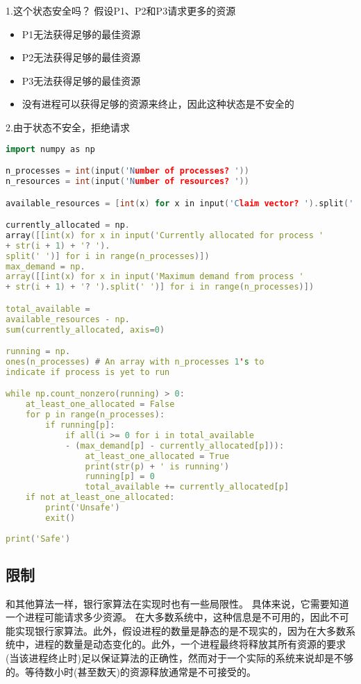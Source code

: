 1.这个状态安全吗？ 假设P1、P2和P3请求更多的资源
\begin{itemize}
\item P1无法获得足够的最佳资源
\item P2无法获得足够的最佳资源
\item P3无法获得足够的最佳资源
\item 没有进程可以获得足够的资源来终止，因此这种状态是不安全的
\end{itemize}

2.由于状态不安全，拒绝请求
\begin{lstlisting}[language=cpp]
import numpy as np

n_processes = int(input('Number of processes? '))
n_resources = int(input('Number of resources? '))

available_resources = [int(x) for x in input('Claim vector? ').split(' ')]

currently_allocated = np.
array([[int(x) for x in input('Currently allocated for process ' 
+ str(i + 1) + '? ').
split(' ')] for i in range(n_processes)])
max_demand = np.
array([[int(x) for x in input('Maximum demand from process ' 
+ str(i + 1) + '? ').split(' ')] for i in range(n_processes)])

total_available = 
available_resources - np.
sum(currently_allocated, axis=0)

running = np.
ones(n_processes) # An array with n_processes 1's to 
indicate if process is yet to run

while np.count_nonzero(running) > 0:
	at_least_one_allocated = False
	for p in range(n_processes):
		if running[p]:
			if all(i >= 0 for i in total_available 
            - (max_demand[p] - currently_allocated[p])):
				at_least_one_allocated = True
				print(str(p) + ' is running')
				running[p] = 0
				total_available += currently_allocated[p]
	if not at_least_one_allocated:
		print('Unsafe')
		exit()
				
print('Safe')
\end{lstlisting}

\subsection{限制}
和其他算法一样，银行家算法在实现时也有一些局限性。 具体来说，它需要知道一个进程可能请求多少资源。 在大多数系统中，这种信息是不可用的，因此不可能实现银行家算法。此外，假设进程的数量是静态的是不现实的，因为在大多数系统中，进程的数量是动态变化的。此外，一个进程最终将释放其所有资源的要求(当该进程终止时)足以保证算法的正确性，然而对于一个实际的系统来说却是不够的。等待数小时(甚至数天)的资源释放通常是不可接受的。